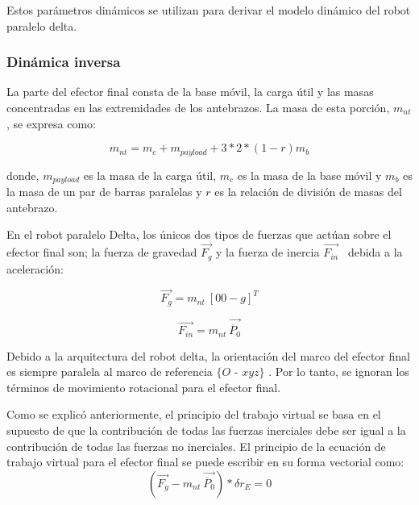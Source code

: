                 Estos parámetros dinámicos se utilizan para derivar el modelo dinámico del robot paralelo delta. 
\newpage

            \subsubsection{Dinámica inversa}
                La parte del efector final consta de la base móvil, la carga útil y las masas concentradas en las extremidades de los antebrazos. La masa de esta porción,  \( m_{nt} \) , se expresa como:
                
                 \[ m_{nt}=m_{c}+m_{payload}+3\ast 2 \ast \left( 1-r \right) m_{b} \] 
                
                donde,  \( m_{payload} \)  es la masa de la carga útil,  \( m_{c} \)  es la masa de la base móvil y  \( m_{b} \)  es la masa de un par de barras paralelas y  \( r \)  es la relación de división de masas del antebrazo.
                
                En el robot paralelo Delta, los únicos dos tipos de fuerzas que actúan sobre el efector final son; la fuerza de gravedad  \( \overrightarrow{F_{g}} \)  y la fuerza de inercia  \( \overrightarrow{F_{in}} \) \  debida a la aceleración:
                
                 \[ \overrightarrow{F_{g}}=m_{nt}~ \left[ 0 0-g \right] ^{T} \] 
                
                 \[ \overrightarrow{F_{in}}=m_{nt}~\overrightarrow{\ddot{P_{0}}} \] 
                
                Debido a la arquitectura del robot delta, la orientación del marco del efector final es siempre paralela al marco de referencia $ \{O$ - $xyz\} $ . Por lo tanto, se ignoran los términos de movimiento rotacional para el efector final.
                
                Como se explicó anteriormente, el principio del trabajo virtual se basa en el supuesto de que la contribución de todas las fuerzas inerciales debe ser igual a la contribución de todas las fuerzas no inerciales. El principio de la ecuación de trabajo virtual para el efector final se puede escribir en su forma vectorial como:
                \begin{equation}
                    \left( \overrightarrow{F_{g}}-m_{nt}~\overrightarrow{\ddot{P_{0}}} \right) \ast \delta r_{E}=0 
                \label{anex_dina_inver_mb_1}
                \end{equation}
                
